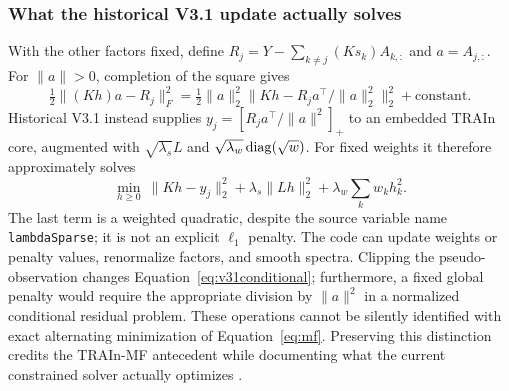 \subsubsection{What the historical V3.1 update actually solves}
With the other factors fixed, define $R_j=Y-\sum_{k\ne j}(Ks_k)A_{k,:}$ and $a=A_{j,:}$. For $\|a\|>0$, completion of the square gives
\begin{equation}\label{eq:v31conditional}
 \tfrac12\|(Kh)a-R_j\|_F^2
 =\tfrac12\|a\|_2^2\|Kh-R_ja^\top/\|a\|_2^2\|_2^2+\mathrm{constant}.
\end{equation}
Historical V3.1 instead supplies $y_j=[R_ja^\top/\|a\|^2]_+$ to an embedded TRAIn core, augmented with $\sqrt{\lambda_s}L$ and $\sqrt{\lambda_w}\operatorname{diag}(\sqrt w)$. For fixed weights it therefore approximately solves
\begin{equation}\label{eq:v31penalty}
 \min_{h\geq0}\ \|Kh-y_j\|_2^2+\lambda_s\|Lh\|_2^2
                       +\lambda_w\sum_k w_k h_k^2.
\end{equation}
The last term is a weighted quadratic, despite the source variable name \texttt{lambdaSparse}; it is not an explicit $\ell_1$ penalty. The code can update weights or penalty values, renormalize factors, and smooth spectra. Clipping the pseudo-observation changes Equation~\eqref{eq:v31conditional}; furthermore, a fixed global penalty would require the appropriate division by $\|a\|^2$ in a normalized conditional residual problem. These operations cannot be silently identified with exact alternating minimization of Equation~\eqref{eq:mf}. Preserving this distinction credits the TRAIn-MF antecedent \cite{train,mfv31} while documenting what the current constrained solver actually optimizes \cite{software}.
